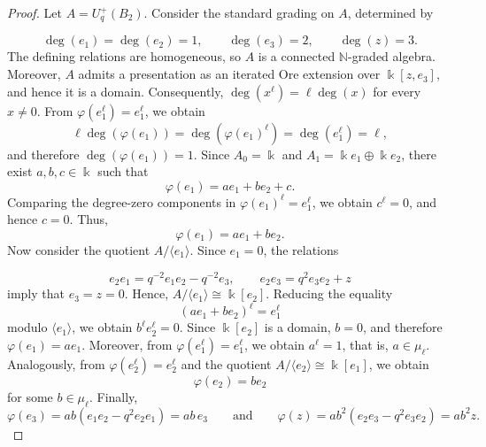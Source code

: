 \documentclass[10pt,a4paper]{amsart}
\newcommand{\K}{\Bbbk}
\begin{document}
\begin{proof}
Let \(A=U_q^+(B_2)\). Consider the standard grading on \(A\), determined by

$$
\deg(e_1)=\deg(e_2)=1,\qquad
\deg(e_3)=2,\qquad
\deg(z)=3.
$$
The defining relations are homogeneous, so \(A\) is a connected
\(\mathbb N\)-graded algebra. Moreover, \(A\) admits a presentation as an
iterated Ore extension over \(\K[z,e_3]\), and hence it is a domain.
Consequently, \(\deg(x^\ell)=\ell\deg(x)\) for every \(x\neq0\). From
\(\varphi(e_1^\ell)=e_1^\ell\), we obtain
$$
\ell\deg(\varphi(e_1))
=\deg(\varphi(e_1)^\ell)
=\deg(e_1^\ell)
=\ell,
$$
and therefore \(\deg(\varphi(e_1))=1\). Since
\(A_0=\K\) and \(A_1=\K e_1\oplus\K e_2\), there exist \(a,b,c\in\K\) such that
$$
\varphi(e_1)=ae_1+be_2+c.
$$
Comparing the degree-zero components in
\(\varphi(e_1)^\ell=e_1^\ell\), we obtain \(c^\ell=0\), and hence \(c=0\). Thus,
$$
\varphi(e_1)=ae_1+be_2.
$$
Now consider the quotient \(A/\langle e_1\rangle\). Since \(e_1=0\), the relations

$$
e_2e_1=q^{-2}e_1e_2-q^{-2}e_3,
\qquad
e_2e_3=q^2e_3e_2+z
$$
imply that \(e_3=z=0\). Hence, \(A/\langle e_1\rangle\cong\K[e_2]\). Reducing the equality
$$
(ae_1+be_2)^\ell=e_1^\ell
$$
modulo \(\langle e_1\rangle\), we obtain \(b^\ell e_2^\ell=0\). Since
\(\K[e_2]\) is a domain, \(b=0\), and therefore \(\varphi(e_1)=ae_1\).
Moreover, from \(\varphi(e_1^\ell)=e_1^\ell\), we obtain \(a^\ell=1\), that is,
\(a\in\mu_\ell\).
\noindent Analogously, from \(\varphi(e_2^\ell)=e_2^\ell\) and the quotient
\(A/\langle e_2\rangle\cong\K[e_1]\), we obtain
$$
\varphi(e_2)=be_2
$$
for some \(b\in\mu_\ell\). Finally,
$$
\varphi(e_3)=ab(e_1e_2-q^2e_2e_1)=ab\,e_3
\qquad\text{and}\qquad
\varphi(z)=ab^2(e_2e_3-q^2e_3e_2)=ab^2z.
$$
\end{proof}
\end{document}

